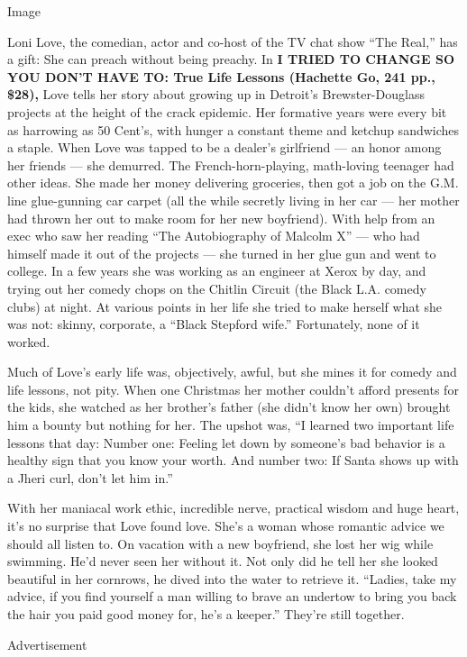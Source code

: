 Image

Loni Love, the comedian, actor and co-host of the TV chat show ``The
Real,'' has a gift: She can preach without being preachy. In \textbf{I
TRIED TO CHANGE SO YOU DON'T HAVE TO: True Life Lessons (Hachette Go,
241 pp., \$28),} Love tells her story about growing up in Detroit's
Brewster-Douglass projects at the height of the crack epidemic. Her
formative years were every bit as harrowing as 50 Cent's, with hunger a
constant theme and ketchup sandwiches a staple. When Love was tapped to
be a dealer's girlfriend --- an honor among her friends --- she
demurred. The French-horn-playing, math-loving teenager had other ideas.
She made her money delivering groceries, then got a job on the G.M. line
glue-gunning car carpet (all the while secretly living in her car ---
her mother had thrown her out to make room for her new boyfriend). With
help from an exec who saw her reading ``The Autobiography of Malcolm X''
--- who had himself made it out of the projects --- she turned in her
glue gun and went to college. In a few years she was working as an
engineer at Xerox by day, and trying out her comedy chops on the Chitlin
Circuit (the Black L.A. comedy clubs) at night. At various points in her
life she tried to make herself what she was not: skinny, corporate, a
``Black Stepford wife.'' Fortunately, none of it worked.

Much of Love's early life was, objectively, awful, but she mines it for
comedy and life lessons, not pity. When one Christmas her mother
couldn't afford presents for the kids, she watched as her brother's
father (she didn't know her own) brought him a bounty but nothing for
her. The upshot was, ``I learned two important life lessons that day:
Number one: Feeling let down by someone's bad behavior is a healthy sign
that you know your worth. And number two: If Santa shows up with a Jheri
curl, don't let him in.''

With her maniacal work ethic, incredible nerve, practical wisdom and
huge heart, it's no surprise that Love found love. She's a woman whose
romantic advice we should all listen to. On vacation with a new
boyfriend, she lost her wig while swimming. He'd never seen her without
it. Not only did he tell her she looked beautiful in her cornrows, he
dived into the water to retrieve it. ``Ladies, take my advice, if you
find yourself a man willing to brave an undertow to bring you back the
hair you paid good money for, he's a keeper.'' They're still together.

Advertisement

